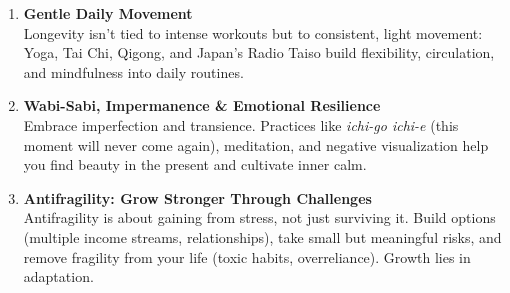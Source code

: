 \begin{enumerate}
    \item \textbf{Gentle Daily Movement} \\
    Longevity isn’t tied to intense workouts but to consistent, light movement: Yoga, Tai Chi, Qigong, and Japan’s Radio Taiso build flexibility, circulation, and mindfulness into daily routines.

    \item \textbf{Wabi-Sabi, Impermanence \& Emotional Resilience} \\
    Embrace imperfection and transience. Practices like \textit{ichi-go ichi-e} (this moment will never come again), meditation, and negative visualization help you find beauty in the present and cultivate inner calm.

    \item \textbf{Antifragility: Grow Stronger Through Challenges} \\
    Antifragility is about gaining from stress, not just surviving it. Build options (multiple income streams, relationships), take small but meaningful risks, and remove fragility from your life (toxic habits, overreliance). Growth lies in adaptation.
\end{enumerate}
